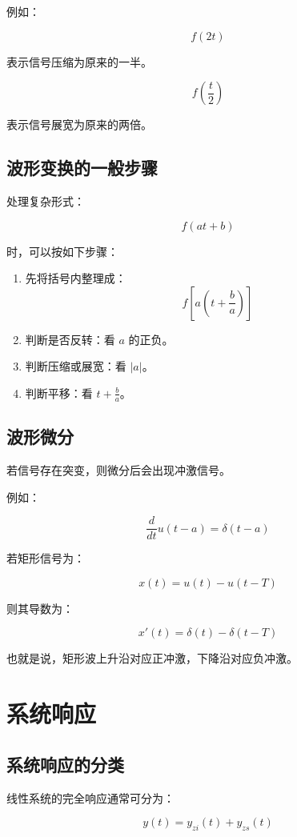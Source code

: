 \documentclass[UTF8]{ctexart}
\begin{document}
例如：

\[
f(2t)
\]

表示信号压缩为原来的一半。

\[
f\left(\frac{t}{2}\right)
\]

表示信号展宽为原来的两倍。

\subsection{波形变换的一般步骤}

处理复杂形式：

\[
f(at+b)
\]

时，可以按如下步骤：

\begin{enumerate}
    \item 先将括号内整理成：
    \[
    f\left[a\left(t+\frac{b}{a}\right)\right]
    \]
    \item 判断是否反转：看 $a$ 的正负。
    \item 判断压缩或展宽：看 $|a|$。
    \item 判断平移：看 $t+\frac{b}{a}$。
\end{enumerate}

\subsection{波形微分}

若信号存在突变，则微分后会出现冲激信号。

例如：

\[
\frac{d}{dt}u(t-a)=\delta(t-a)
\]

若矩形信号为：

\[
x(t)=u(t)-u(t-T)
\]

则其导数为：

\[
x'(t)=\delta(t)-\delta(t-T)
\]

也就是说，矩形波上升沿对应正冲激，下降沿对应负冲激。

\section{系统响应}

\subsection{系统响应的分类}

线性系统的完全响应通常可分为：

\[
y(t)=y_{zi}(t)+y_{zs}(t)
\]
\end{document}
